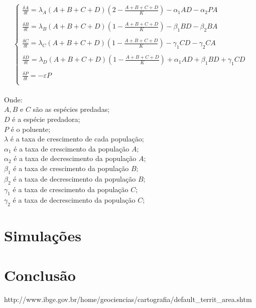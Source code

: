 \documentclass[a4paper]{article}
\begin{document}
\begin{equation}
\left\{\begin{array}{l}
\frac{\delta A}{\delta t} =  \lambda_A (A + B + C + D)(2 - \frac{A + B + C +D}{K}) -\alpha_1AD - \alpha_2PA  \\
\\
\frac{\delta B}{\delta t} =  \lambda_B (A + B + C + D)(1 - \frac{A + B + C +D}{K}) -\beta_1BD - \beta_2BA  \\
\\
\frac{\delta C}{\delta t} =  \lambda_C (A + B + C + D)(1 - \frac{A + B + C +D}{K}) -\gamma_1CD - \gamma_2CA  \\
\\
\frac{\delta D}{\delta t} =  \lambda_D (A + B + C + D)(1 - \frac{A + B + C +D}{K}) + \alpha_1AD + \beta_1 BD + \gamma_1CD  \\
\\
\frac{\delta P}{\delta t} = - \varepsilon P \\
\end{array}
\end{equation}
\\
Onde:
\\
$A, B$ e $C$ s\~ao as esp\'ecies predadas;
\\
$D$ \'e a esp\'ecie predadora;
\\
$P$ \'e o poluente;
\\
$\lambda$ \'e a taxa de crescimento de cada popula\c{c}\~ao;
\\
$\alpha_1$ \'e a taxa de crescimento da popula\c{c}\~ao $A$;
\\
$\alpha_2$ \'e a taxa de decrescimento da popula\c{c}\~ao $A$;
\\
$\beta_1$ \'e a taxa de crescimento da popula\c{c}\~ao $B$;
\\
$\beta_2$ \'e a taxa de decrescimento da popula\c{c}\~ao $B$;
\\
$\gamma_1$ \'e a taxa de crescimento da popula\c{c}\~ao $C$;
\\
$\gamma_2$ \'e a taxa de decrescimento da popula\c{c}\~ao $C$;
\section{Simula\c{c}\~oes}
\section{Conclus\~ao}
\begin{thebibliography}{99}
 http://www.ibge.gov.br/home/geociencias/cartografia/default\_territ\_area.shtm
\end{thebibliography}
\end{document}

